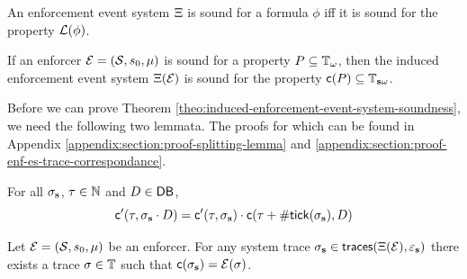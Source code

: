 \begin{definition}
    \label{def:enf-event-system-soundness-formula}
    An enforcement event system $\Xi$ is sound for a formula $\phi$
    iff it is sound for the property $\mathcal{L}(\phi)$.
\end{definition}

\begin{theorem}
    \label{theo:induced-enforcement-event-system-soundness}
    If an enforcer $\mathcal{E} = (\mathcal{S}, s_0, \mu)$ is sound for a
    property $P \subseteq \mathbb{T}_\omega$, then the induced enforcement event
    system $\Xi(\mathcal{E})$ is sound for the property
    $\mathsf{c}(P) \subseteq \mathbb{T}_{\mathbf{s} \omega}$.
\end{theorem}

Before we can prove Theorem
\ref{theo:induced-enforcement-event-system-soundness},
we need the following two lemmata.
The proofs for which can be found in Appendix
\ref{appendix:section:proof-splitting-lemma} and
\ref{appendix:section:proof-enf-es-trace-correspondance}.
\begin{lemma}
    \label{lem:cconv'-splitting}
    For all $\sigma_{\mathbf{s}}$, $\tau \in \mathbb{N}$ and $D \in \mathsf{DB}$,
    \begin{equation*}
        \mathsf{c}'(\tau, \sigma_{\mathbf{s}} \cdot D)
        = \mathsf{c}'(\tau, \sigma_{\mathbf{s}}) \cdot
        \mathsf{c}(\tau + \mathsf{\#tick}(\sigma_{\mathbf{s}}), D)
    \end{equation*}
\end{lemma}

\begin{lemma}
    \label{lem:enf-es-trace-correspondance}
    Let $\mathcal{E} = (\mathcal{S}, s_0, \mu)$ be an enforcer.
    For any system trace
    $\sigma_{\mathbf{s}} \in \mathsf{traces}(\Xi(\mathcal{E}), \varepsilon_{\mathbf{s}})$
    there exists a trace $\sigma \in \mathbb{T}$ such that
    $\mathsf{c}(\sigma_{\mathbf{s}}) = \mathcal{E}(\sigma)$.
\end{lemma}

